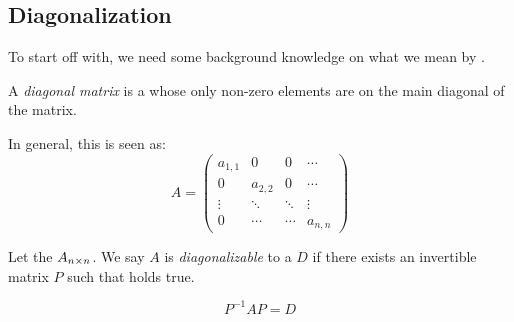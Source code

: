 \subsection{Diagonalization}\label{subsec:Diagonalization}
To start off with, we need some background knowledge on what we mean by .

\begin{definition}\label{def:Diagonal_Matrix}
  A \emph{diagonal matrix} is a  whose only non-zero elements are on the main diagonal of the matrix.

  In general, this is seen as:
  \begin{equation}\label{eq:Diagonal_Matrix}
    A =
    \begin{pmatrix}
      a_{1,1} & 0 & 0 & \cdots \\
      0 & a_{2,2} & 0 & \cdots \\
      \vdots & \ddots & \ddots & \vdots \\
      0 & \cdots & \cdots & a_{n, n}
    \end{pmatrix}
  \end{equation}
\end{definition}

\begin{definition}[Diagonalizable]\label{def:Diagonalizable}
  Let the  $A_{n \times n}$.
  We say $A$ is \emph{diagonalizable} to a  $D$ if there exists an invertible matrix $P$ such that  holds true.

  \begin{equation}\label{eq:Diagonalizable}
    P^{-1} A P = D
  \end{equation}
\end{definition}


